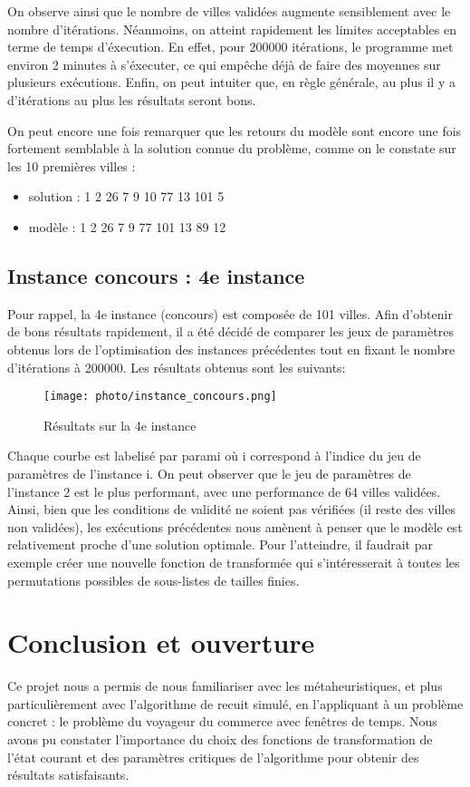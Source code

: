 \documentclass[a4paper, 12pt]{article}
\begin{document}
On observe ainsi que le nombre de villes validées augmente sensiblement avec le nombre d'itérations.
Néanmoins, on atteint rapidement les limites acceptables en terme de temps d'éxecution. En effet, pour 200000 itérations, le programme met environ 2 minutes à s'éxecuter, ce qui empêche déjà de faire des moyennes sur plusieurs exécutions.
Enfin, on peut intuiter que, en règle générale, au plus il y a d'itérations au plus les résultats seront bons.


On peut encore une fois remarquer que les retours du modèle sont encore une fois fortement semblable à la solution connue du problème, comme on le constate sur les 10 premières villes :
\begin{itemize}
    \item solution : 1 2 26 7 9 10 77  13 101 5
    \item modèle   : 1 2 26 7 9 77 101 13 89  12
\end{itemize}

\subsection{Instance concours : 4e instance}
Pour rappel, la 4e instance (concours) est composée de 101 villes.
Afin d'obtenir de bons résultats rapidement, il a été décidé de comparer les jeux de paramètres obtenus lors de l'optimisation des instances précédentes tout en fixant 
le nombre d'itérations à 200000. Les résultats obtenus sont les suivants:
\begin{figure}[!h]
    \centering
    \texttt{[image: photo/instance\_concours.png]}
    \caption{Résultats sur la 4e instance}
    \label{fig:parametres_4}
\end{figure}

Chaque courbe est labelisé par param{i} où i correspond à l'indice du jeu de paramètres de l'instance i.
On peut observer que le jeu de paramètres de l'instance 2 est le plus performant, avec une performance de 64 villes validées.
Ainsi, bien que les conditions de validité ne soient pas vérifiées (il reste des villes non validées), les exécutions précédentes nous amènent à penser que le modèle est relativement proche d'une solution optimale.
Pour l'atteindre, il faudrait par exemple créer une nouvelle fonction de transformée qui s'intéresserait à toutes les permutations possibles de sous-listes de tailles finies.


\section{Conclusion et ouverture}
Ce projet nous a permis de nous familiariser avec les métaheuristiques, et plus particulièrement avec l'algorithme de recuit simulé, en l'appliquant à un problème concret : le problème du voyageur du commerce avec fenêtres de temps. Nous avons pu constater l'importance du choix des fonctions de transformation de l'état courant et des paramètres critiques de l'algorithme pour obtenir des résultats satisfaisants.
\end{document}

